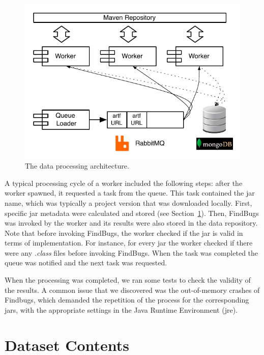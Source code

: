 \documentclass{sig-alternate}
\begin{document}
\begin{figure}[t]
  \begin{center}
    \includegraphics[scale=0.73]{figures/arch.pdf}
  \end{center}
  \caption{The data processing architecture.}
  \label{fig:arch}
\end{figure}

A typical processing cycle of a worker included the
following steps: after the worker spawned, it requested a task
from the queue. This task contained the {\sc jar} name, which
was typically a project version that was downloaded locally.
First, specific {\sc jar} metadata were calculated and stored
(see Section~\ref{sec:data}).
Then, FindBugs was invoked
by the worker and its results were also stored in the data
repository.
Note that before invoking FindBugs,
the worker checked if the {\sc jar} is valid in terms of implementation.
For instance, for every {\sc jar} the worker checked
if there were any {\it .class} files before invoking FindBugs.
When the task was completed
the queue was notified and the next task was requested.

When the processing was completed, we ran some tests
to check the validity of the results.
A common issue that we discovered was the out-of-memory
crashes of Findbugs, which demanded the repetition of the process
for the corresponding {\sc jar}s, with the appropriate
settings in the Java Runtime Environment ({\sc jre}).

\section{Dataset Contents}
\label{sec:data}
\end{document}
